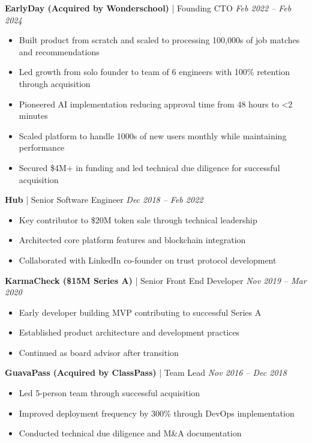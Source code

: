 \documentclass[letterpaper,10pt]{article}
\begin{document}
\textbf{EarlyDay (Acquired by Wonderschool)} | Founding CTO \hfill \textit{Feb 2022 -- Feb 2024}
\begin{itemize}[leftmargin=*, nosep]
    \item Built product from scratch and scaled to processing 100,000s of job matches and recommendations
    \item Led growth from solo founder to team of 6 engineers with 100\% retention through acquisition
    \item Pioneered AI implementation reducing approval time from 48 hours to <2 minutes
    \item Scaled platform to handle 1000s of new users monthly while maintaining performance
    \item Secured \$4M+ in funding and led technical due diligence for successful acquisition
\end{itemize}

\textbf{Hub} | Senior Software Engineer \hfill \textit{Dec 2018 -- Feb 2022}
\begin{itemize}[leftmargin=*, nosep]
    \item Key contributor to \$20M token sale through technical leadership
    \item Architected core platform features and blockchain integration
    \item Collaborated with LinkedIn co-founder on trust protocol development
\end{itemize}

\textbf{KarmaCheck (\$15M Series A)} | Senior Front End Developer \hfill \textit{Nov 2019 -- Mar 2020}
\begin{itemize}[leftmargin=*, nosep]
    \item Early developer building MVP contributing to successful Series A
    \item Established product architecture and development practices
    \item Continued as board advisor after transition
\end{itemize}

\textbf{GuavaPass (Acquired by ClassPass)} | Team Lead \hfill \textit{Nov 2016 -- Dec 2018}
\begin{itemize}[leftmargin=*, nosep]
    \item Led 5-person team through successful acquisition
    \item Improved deployment frequency by 300\% through DevOps implementation
    \item Conducted technical due diligence and M\&A documentation
\end{itemize}
\end{document}
